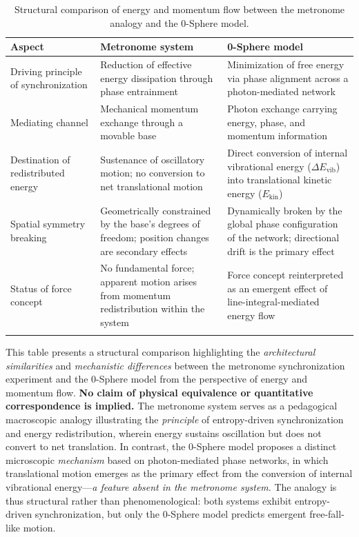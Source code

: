 \documentclass[
 reprint,
 amsmath,amssymb,
 aps,
 prb,
]{revtex4-2}
\numberwithin{equation}{section}
\begin{document}
\begin{table}[th!]
\centering
\caption{Structural comparison of energy and momentum flow between the metronome analogy and the 0-Sphere model.}
\label{tab:metronome_vs_0sphere_energy_flow}
\renewcommand{\arraystretch}{1.4}
\begin{tabular}{p{5.0cm}p{6.0cm}p{6.0cm}}
\toprule
\textbf{Aspect} & \textbf{Metronome system} & \textbf{0-Sphere model} \\
\midrule
Driving principle of synchronization
& Reduction of effective energy dissipation through phase entrainment
& Minimization of free energy via phase alignment across a photon-mediated network \\
\addlinespace[0.25cm]
Mediating channel
& Mechanical momentum exchange through a movable base
& Photon exchange carrying energy, phase, and momentum information \\
\addlinespace[0.25cm]
Destination of redistributed energy
& Sustenance of oscillatory motion; no conversion to net translational motion
& Direct conversion of internal vibrational energy ($\Delta E_\text{vib}$) into translational kinetic energy ($E_\text{kin}$) \\
\addlinespace[0.25cm]
Spatial symmetry breaking
& Geometrically constrained by the base's degrees of freedom; position changes are secondary effects
& Dynamically broken by the global phase configuration of the network; directional drift is the primary effect \\
\addlinespace[0.25cm]
Status of force concept
& No fundamental force; apparent motion arises from momentum redistribution within the system
& Force concept reinterpreted as an emergent effect of line-integral-mediated energy flow \\
\addlinespace[0.20cm]
\bottomrule
\end{tabular}
\vspace{0.4em}
\begin{minipage}{0.95\textwidth}
\justifying\small
This table presents a structural comparison highlighting the \textit{architectural similarities} and \textit{mechanistic differences} between the metronome synchronization experiment and the 0-Sphere model from the perspective of energy and momentum flow. \textbf{No claim of physical equivalence or quantitative correspondence is implied.} The metronome system serves as a pedagogical macroscopic analogy illustrating the \textit{principle} of entropy-driven synchronization and energy redistribution, wherein energy sustains oscillation but does not convert to net translation. In contrast, the 0-Sphere model proposes a distinct microscopic \textit{mechanism} based on photon-mediated phase networks, in which translational motion emerges as the primary effect from the conversion of internal vibrational energy—\textit{a feature absent in the metronome system}. The analogy is thus structural rather than phenomenological: both systems exhibit entropy-driven synchronization, but only the 0-Sphere model predicts emergent free-fall-like motion.
\end{minipage}
\end{table}
\end{document}
